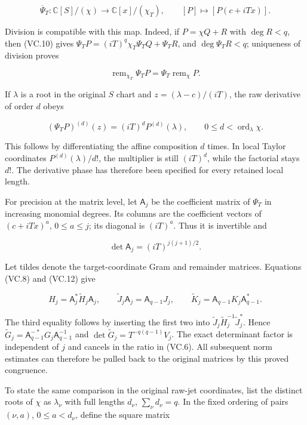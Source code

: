 \[
 \overline\Psi_T:\mathbb C[S]/(\chi)\longrightarrow
                         \mathbb C[x]/(\chi_T),\qquad
 [P]\longmapsto[P(c+iTx)].
\tag{VC.11}
\]

Division is compatible with this map. Indeed, if \(P=\chi Q+R\) with \(\deg R<q\), then (VC.10) gives \(\Psi_TP=(iT)^q\chi_T\Psi_TQ+\Psi_TR\), and \(\deg\Psi_TR<q\); uniqueness of division proves

\[
 \operatorname{rem}_{\chi_T}\Psi_TP=
                         \Psi_T\operatorname{rem}_{\chi}P.
\tag{VC.12}
\]

If \(\lambda\) is a root in the original \(S\) chart and \(z=(\lambda-c)/(iT)\), the raw derivative of order \(d\) obeys

\[
 (\Psi_TP)^{(d)}(z)=(iT)^dP^{(d)}(\lambda),
 \qquad 0\le d<\operatorname{ord}_{\lambda}\chi.
\tag{VC.13}
\]

This follows by differentiating the affine composition \(d\) times. In local Taylor coordinates \(P^{(d)}(\lambda)/d!\), the multiplier is still \((iT)^d\), while the factorial stays \(d!\). The derivative phase has therefore been specified for every retained local length.

For precision at the matrix level, let \(\mathsf A_j\) be the coefficient matrix of \(\Psi_T\) in increasing monomial degrees. Its columns are the coefficient vectors of \((c+iTx)^a\), \(0\le a\le j\); its diagonal is \((iT)^a\). Thus it is invertible and

\[
 \det\mathsf A_j=(iT)^{j(j+1)/2}.
\tag{VC.14}
\]

Let tildes denote the target-coordinate Gram and remainder matrices. Equations (VC.8) and (VC.12) give

\[
 H_j=\mathsf A_j^*\widetilde H_j\mathsf A_j,
 \qquad \widetilde J_j\mathsf A_j=\mathsf A_{q-1}J_j,
 \qquad \widetilde K_j=\mathsf A_{q-1}K_j\mathsf A_{q-1}^*.
\tag{VC.15}
\]

The third equality follows by inserting the first two into \(\widetilde J_j\widetilde H_j^{-1}\widetilde J_j^*\). Hence \(\widetilde G_j=\mathsf A_{q-1}^{-*}G_j\mathsf A_{q-1}^{-1}\) and \(\det\widetilde G_j=T^{-q(q-1)}V_j\). The exact determinant factor is independent of \(j\) and cancels in the ratio in (VC.6). All subsequent norm estimates can therefore be pulled back to the original matrices by this proved congruence.

To state the same comparison in the original raw-jet coordinates, list the distinct roots of \(\chi\) as \(\lambda_\nu\) with full lengths \(d_\nu\), \(\sum_\nu d_\nu=q\). In the fixed ordering of pairs \((\nu,a)\), \(0\le a<d_\nu\), define the square matrix

